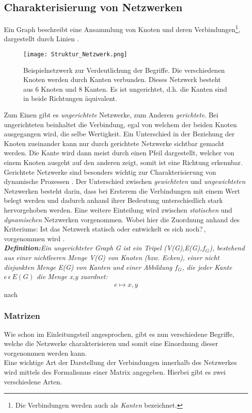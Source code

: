 \documentclass[fontsize=11pt, twoside, a4paper]{scrartcl}
\begin{document}
\subsection{Charakterisierung von Netzwerken}
\label{sec:St6}
Ein Graph beschreibt eine Ansammlung von Knoten und deren Verbindungen\footnote{Die Verbindungen werden auch als \textit{Kanten} bezeichnet.}, dargestellt durch Linien \cite{GraphTheory}.\\
\begin{figure}[H]
	\centering
		\texttt{[image: Struktur\_Netzwerk.png]}
		\caption{Beispielnetzwerk zur Verdeutlichung der Begriffe. Die verschiedenen Knoten werden durch Kanten verbunden. Dieses Netzwerk besteht aus 6 Knoten und 8 Kanten. Es ist ungerichtet, d.h. die Kanten sind in beide Richtungen äquivalent.}
\end{figure}
Zum Einen gibt es \textit{ungerichtete} Netzwerke, zum Anderen \textit{gerichtete}. Bei ungerichteten beinhaltet die Verbindung, egal von welchem der beiden Knoten ausgegangen wird, die selbe Wertigkeit. Ein Unterschied in der Beziehung der Knoten zueinander kann nur durch gerichtete Netzwerke sichtbar gemacht werden. Die Kante wird dann meist durch einen Pfeil dargestellt, welcher von einem Knoten ausgeht auf den anderen zeigt, somit ist eine Richtung erkennbar. Gerichtete Netzwerke sind besonders wichtig zur Charakterisierung von dynamische Prozessen \cite{ComplexNetworks}. Der Unterschied zwischen \textit{gewichteten} und \textit{ungewichteten} Netzwerken besteht darin, dass bei Ersterem die Verbindungen mit einem Wert belegt werden und dadurch anhand ihrer Bedeutung unterschiedlich stark hervorgehoben werden. Eine weitere Einteilung wird zwischen \textit{statischen} und \textit{dynamischen} Netzwerken vorgenommen. Wobei hier die Zuordnung anhand des Kriteriums: \glqq Ist das Netzwerk statisch oder entwickelt es sich noch?\grqq\,, vorgenommen wird \cite{ComplexNetworks}.\\
\emph{
\textbf{Definition:}\qquad Ein \emph{ungerichteter} Graph G ist ein Tripel (V(G),E(G),$f_{G}$), bestehend aus einer nichtleeren Menge V(G) von \emph{Knoten} (bzw. Ecken), einer nicht disjunkten Menge E(G) von \emph{Kanten} und einer Abbildung $f_{G}$, die jeder Kante $e \, \epsilon \, E(G)$ die Menge {x,y} zuordnet:}
\begin{align}
e \mapsto {x,y}
\end{align}
nach \cite{GraphDefinition}\\[\baselineskip]

\subsubsection*{Matrizen}
Wie schon im Einleitungsteil angesprochen, gibt es nun verschiedene Begriffe, welche die Netzwerke charakterisieren und somit eine Einordnung dieser vorgenommen werden kann.\\
Eine wichtige Art der Darstellung der Verbindungen innerhalb des Netzwerkes wird mittels des Formalismus einer Matrix \cite{ComplexNetworks} angegeben. Hierbei gibt es zwei verschiedene Arten.
\end{document}
